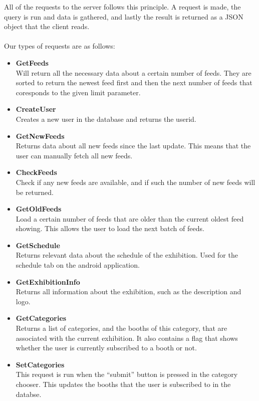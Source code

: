 All of the requests to the server follows this principle. A request is made, the query is run and data is gathered, and lastly the result is returned as a JSON object that the client reads.\\\\
Our types of requests are as follows:
\begin{itemize}
\item \textbf{GetFeeds}\\
 Will return all the necessary data about a certain number of feeds. They are sorted to return the newest feed first and then the next number of feeds that coresponds to the given limit parameter.
\item \textbf{CreateUser}\\
  Creates a new user in the database and returns the userid.
\item \textbf{GetNewFeeds}\\
  Returns data about all new feeds since the last update. This means that the user can manually fetch all new feeds.
\item \textbf{CheckFeeds}\\
  Check if any new feeds are available, and if such the number of new feeds will be returned.
\item \textbf{GetOldFeeds}\\
  Load a certain number of feeds that are older than the current oldest feed showing. This allows the user to load the next batch of feeds.
\item \textbf{GetSchedule}\\
  Returns relevant data about the schedule of the exhibition. Used for the schedule tab on the android application.
\item \textbf{GetExhibitionInfo}\\
  Returns all information about the exhibition, such as the description and logo.
\item \textbf{GetCategories}\\
  Returns a list of categories, and the booths of this category, that are associated with the current exhibition. It also contains a flag that shows whether the user is currently subscribed to a booth or not.
\item \textbf{SetCategories}\\
  This request is run when the ``submit'' button is pressed in the category chooser. This updates the booths that the user is subscribed to in the databse.
\end{itemize}


